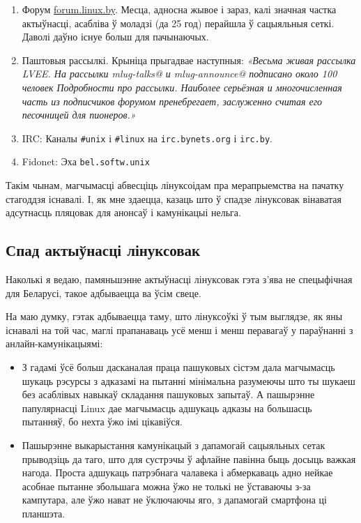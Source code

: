 \documentclass[10pt, a5paper]{article}
\def\vv!#1!{\texttt{#1}}
\begin{document}
\begin{enumerate}
  \item Форум \url{forum.linux.by}. Месца, адносна жывое і зараз, калі значная частка актыўнасці, асабліва ў моладзі (да 25 год) перайшла ў сацыяльныя сеткі. Даволі даўно існуе больш для пачынаючых.
  \item Паштовыя рассылкі. Крыніца прыгадвае наступныя: \textit{«Весьма живая рассылка LVEE. На рассылки mlug-talks@ и mlug-announce@ подписано около 100 человек Подробности про рассылки. Наиболее серьёзная и многочисленная часть из подписчиков форумом пренебрегает, заслуженно считая его песочницей для пионеров.»}
  \item IRC: Каналы \vv!\#unix! і \vv!\#linux! на \vv!irc.bynets.org! і \vv!irc.by!.
  \item Fidonet: Эха \vv!bel.softw.unix!
\end{enumerate}

Такім чынам, магчымасці абвесціць лінуксоідам пра мерапрыемства на пачатку стагоддзя існавалі. І, як мне здаецца, казаць што ў спадзе лінуксовак вінаватая адсутнасць пляцовак для анонсаў і камунікацыі нельга.

\subsection*{Спад актыўнасці лінуксовак}

Наколькі я ведаю, памяньшэнне актыўнасці лінуксовак гэта з'ява не спецыфічная для Беларусі, такое адбываецца ва ўсім свеце.

На маю думку, гэтак адбываецца таму, што лінуксоўкі ў тым выглядзе, як яны існавалі на той час, маглі прапанаваць усё менш і менш перавагаў у параўнанні з анлайн-камунікацыямі:
\begin{itemize}
  \item З гадамі ўсё больш дасканалая праца пашуковых сістэм дала магчымасць шукаць рэсурсы з адказамі на пытанні мінімальна разумеючы што ты шукаеш без асаблівых навыкаў складання пашуковых запытаў. А пашырэнне папулярнасці Linux дае магчымасць адшукаць адказы на большасць пытанняў, бо нехта ўжо імі цікавіўся.
  \item Пашырэнне выкарыстання камунікацый з дапамогай сацыяльных сетак прыводзіць да таго, што для сустрэчы ў афлайне павінна быць досыць важкая нагода. Проста адшукаць патрэбнага чалавека і абмеркаваць адно нейкае асобнае пытанне збольшага можна ўжо не толькі не ўставаючы з-за кампутара, але ўжо нават не ўключаючы яго, з дапамогай смартфона ці планшэта.
\end{itemize}
\end{document}
